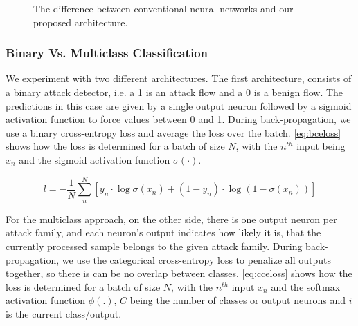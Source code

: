 \documentclass[conference]{IEEEtran}
\begin{document}
\begin{figure}[htp]
\center

\quad
{}

\caption{The difference between conventional neural networks and our proposed architecture.}

\end{figure}

\subsubsection{Binary Vs. Multiclass Classification}
We experiment with two different architectures. The first architecture, consists of a binary attack detector, i.e. a 1 is an attack flow and a 0 is a benign flow. The predictions in this case are given by a single output neuron followed by a sigmoid activation function to force values between 0 and 1. During back-propagation, we use a binary cross-entropy loss and average the loss over the batch. \autoref{eq:bceloss} shows how the loss is determined for a batch of size $N$, with the $n^{th}$ input being $x_{n}$ and the sigmoid activation function $\sigma(\cdot)$.

\begin{equation}
\label{eq:bceloss}
l = - \frac{1}{N} \sum_{n}^{N} [y_n \cdot \log \sigma (x_{n}) + (1 - y_n) \cdot \log (1 - \sigma (x_{n}))]
\end{equation}

For the multiclass approach, on the other side, there is one output neuron per attack family, and each neuron's output indicates how likely it is, that the currently processed sample belongs to the given attack family. During back-propagation, we use the categorical cross-entropy loss to penalize all outputs together, so there is can be no overlap between classes. \autoref{eq:cceloss} shows how the loss is determined for a batch of size $N$, with the $n^{th}$ input $x_{n}$ and the softmax activation function  $\phi(.)$, $C$ being the number of classes or output neurons and $i$ is the current class/output.
\end{document}
